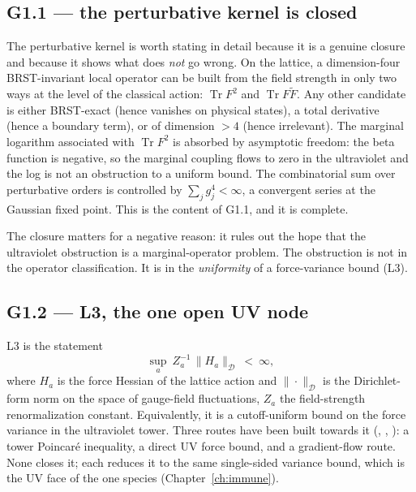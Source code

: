 \subsection{G1.1 --- the perturbative kernel is closed}

The perturbative kernel is worth stating in detail because it is a genuine closure and because it
shows what does \emph{not} go wrong. On the lattice, a dimension-four BRST-invariant local
operator can be built from the field strength in only two ways at the level of the classical
action: $\operatorname{Tr}F^2$ and $\operatorname{Tr}F\tilde F$. Any other candidate is either
BRST-exact (hence vanishes on physical states), a total derivative (hence a boundary term), or of
dimension $>4$ (hence irrelevant). The marginal logarithm associated with $\operatorname{Tr}F^2$
is absorbed by asymptotic freedom: the beta function is negative, so the marginal coupling flows
to zero in the ultraviolet and the log is not an obstruction to a uniform bound. The
combinatorial sum over perturbative orders is controlled by $\sum_j g_j^4<\infty$, a convergent
series at the Gaussian fixed point. This is the content of G1.1, and it is complete.

The closure matters for a negative reason: it rules out the hope that the ultraviolet obstruction
is a marginal-operator problem. The obstruction is not in the operator classification. It is in
the \emph{uniformity} of a force-variance bound (L3).

\subsection{G1.2 --- L3, the one open UV node}
\label{sec:l3}

L3 is the statement
\begin{equation}
\sup_a\ Z_a^{-1}\,\|H_a\|_{\mathcal D}\ <\ \infty ,
\label{eq:l3}
\end{equation}
where $H_a$ is the force Hessian of the lattice action and $\|\cdot\|_{\mathcal D}$ is the
Dirichlet-form norm on the space of gauge-field fluctuations, $Z_a$ the field-strength
renormalization constant. Equivalently, it is a cutoff-uniform bound on the force variance in
the ultraviolet tower. Three routes have been built towards it
(, , ):
a tower Poincar\'e inequality, a direct UV force bound, and a gradient-flow route. None closes
it; each reduces it to the same single-sided variance bound, which is the UV face of the one
species (Chapter~\ref{ch:immune}).

